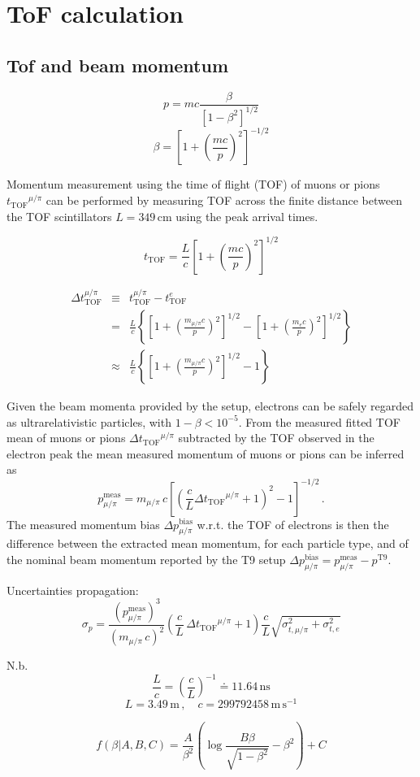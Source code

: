 \documentclass{article}
\newcommand{\ttof}{\ensuremath{t_\mathrm{TOF}}}
\begin{document}
\section{ToF calculation}

\subsection{Tof and beam momentum}


$$ p = mc \frac{\beta}{\left[  1 - \beta^2 \right]^{1/2}}$$
$$ \beta = \left[  1 + \left( \frac{mc}{p} \right)^2 \right]^{-1/2}$$


Momentum measurement using the time of flight (TOF) of muons or pions $\ttof^{\mu/\pi}$ can be performed by measuring TOF across the finite distance between the TOF scintillators $L=349\,\mathrm{cm}$ using the peak arrival times.

$$ t_\mathrm{TOF} = \frac{L}{c} \left[ 1 + \left( \frac{mc}{p}  \right)^2   \right]^{1/2}$$

\begin{eqnarray}
  \Delta t_\mathrm{TOF}^{\mu/\pi} &\equiv&  t^{\mu/\pi}_\mathrm{TOF} - t^e_\mathrm{TOF} \\
    &=& \frac{L}{c}  \left\{  \left[ 1 + \left( \frac{m_{\mu/\pi} c}{p}  \right)^2   \right]^{1/2} -  \left[ 1 + \left( \frac{m_e c}{p}  \right)^2   \right]^{1/2}   \right\} \\
     &\approx& \frac{L}{c}  \left\{  \left[ 1 + \left( \frac{m_{\mu/\pi} c}{p}  \right)^2   \right]^{1/2} - 1  \right\} 
\end{eqnarray}

    Given the beam momenta provided by the setup, electrons can be safely regarded as ultrarelativistic particles, with $1-\beta < 10^{-5}$.
From the measured fitted TOF mean of muons or pions $\Delta\ttof^{\mu/\pi}$ subtracted by the TOF observed in the electron peak the mean measured momentum of muons or pions 
can be inferred as 
$$p_{\mu/\pi}^\mathrm{meas} = m_{\mu/\pi} \, c \left[ \left( \frac{c}{L} \Delta\ttof^{\mu/\pi} + 1 \right)^2  - 1\right]^{-1/2}\,.$$
The measured momentum bias $\Delta p^\mathrm{bias}_{\mu/\pi}$ w.r.t. the TOF of electrons is then the difference between the extracted mean momentum, for each particle type, and of the nominal beam momentum reported by the T9 setup
$\Delta p^\mathrm{bias}_{\mu/\pi} =  p_{\mu/\pi}^\mathrm{meas} -  p^\mathrm{T9}$. 

Uncertainties propagation:
$$ \sigma_p = \frac{ \left( p_{\mu/\pi}^\mathrm{meas} \right)^3}{ \left(  m_{\mu/\pi} \, c \right)^2} \left( \frac{c}{L} \,\Delta\ttof^{\mu/\pi} + 1  \right)  \frac{c}{L} \sqrt{\sigma^2_{t,\mu/\pi} + \sigma^2_{t,e}}$$

N.b.
$$ \frac{L}{c} = \left( \frac{c}{L} \right)^{-1} \doteq 11.64\,\mathrm{ns}$$
$$ L = 3.49\, \mathrm{m}\,, \quad c = 299792458\, \mathrm{m}\,\mathrm{s}^{-1}$$

\clearpage


$$ f(\beta|A,B,C) = \frac{A}{\beta^2} \left( \log \frac{B\beta}{\sqrt{1-\beta^2}} - \beta^2 \right) + C $$
\end{document}
